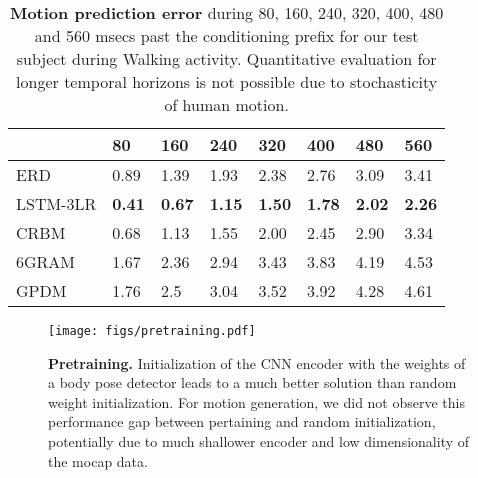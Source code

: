 \documentclass[10pt,twocolumn,letterpaper]{article}
\begin{document}
\begin{table} [h]
{\small
\setlength{\tabcolsep}{2.5pt}
\begin{tabular}{|p{1.52cm}||p{0.75cm}|p{0.75cm}|p{0.75cm}|p{0.75cm}|p{0.75cm}|p{0.75cm}|p{0.75cm}|}
\cline{1-8}
                                             & {80}             & {160}       & {240}       &{320}       & {400} & {480} & {560} \\ \hline 
 ERD                                      & 0.89            & 1.39        & 1.93         & 2.38        & 2.76  &  3.09       &  3.41               \\ \hline 
 LSTM-3LR                           & \textbf{0.41} & \textbf{0.67} & \textbf{1.15} & \textbf{1.50} & \textbf{1.78} & \textbf{2.02} & \textbf{2.26}\\   \hline 
CRBM \cite{thr-mhmub-06} & 0.68              &         1.13      & 1.55             & 2.00             & 2.45              & 2.90              & 3.34\\\hline 
6GRAM &                              1.67                & 2.36              & 2.94              & 3.43             & 3.83             &4.19               &4.53  \\\hline 
GPDM \cite{Wang06gaussianprocess} & 1.76 & 2.5 & 3.04 & 3.52 & 3.92 & 4.28 & 4.61\\   \hline 
\end{tabular}
}
 \caption{ \textbf{Motion prediction error} during 80, 160, 240, 320, 400, 480 and 560 msecs past the conditioning prefix for our test subject during Walking activity.  Quantitative evaluation for longer temporal horizons is not possible due to stochasticity of human motion. }
\label{tab:predictionerror}
\end{table}


\begin{figure}[ht]
\begin{center}
\texttt{[image: figs/pretraining.pdf]}
\end{center}
\caption{\textbf{Pretraining.}  Initialization of the CNN encoder with the weights of a body pose detector leads to a much better solution than random weight initialization. For motion generation, we did not observe this  performance gap between pertaining and random initialization, potentially due to much shallower encoder and  low dimensionality of the mocap data.}
\label{fig:pretraining}
\end{figure}
\end{document}
